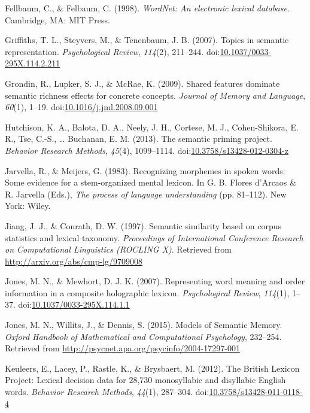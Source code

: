\documentclass[english,,man]{apa6}
\theoremstyle{definition}
\theoremstyle{definition}
\theoremstyle{definition}
\theoremstyle{remark}
\begin{document}
\leavevmode\hypertarget{ref-Felbaum1998}{}%
Fellbaum, C., \& Felbaum, C. (1998). \emph{WordNet: An electronic
lexical database}. Cambridge, MA: MIT Press.

\leavevmode\hypertarget{ref-Griffiths2007}{}%
Griffiths, T. L., Steyvers, M., \& Tenenbaum, J. B. (2007). Topics in
semantic representation. \emph{Psychological Review}, \emph{114}(2),
211--244.
doi:\href{https://doi.org/10.1037/0033-295X.114.2.211}{10.1037/0033-295X.114.2.211}

\leavevmode\hypertarget{ref-Grondin2009}{}%
Grondin, R., Lupker, S. J., \& McRae, K. (2009). Shared features
dominate semantic richness effects for concrete concepts. \emph{Journal
of Memory and Language}, \emph{60}(1), 1--19.
doi:\href{https://doi.org/10.1016/j.jml.2008.09.001}{10.1016/j.jml.2008.09.001}

\leavevmode\hypertarget{ref-Hutchison2013}{}%
Hutchison, K. A., Balota, D. A., Neely, J. H., Cortese, M. J.,
Cohen-Shikora, E. R., Tse, C.-S., \ldots{} Buchanan, E. M. (2013). The
semantic priming project. \emph{Behavior Research Methods},
\emph{45}(4), 1099--1114.
doi:\href{https://doi.org/10.3758/s13428-012-0304-z}{10.3758/s13428-012-0304-z}

\leavevmode\hypertarget{ref-Jarvella1983}{}%
Jarvella, R., \& Meijers, G. (1983). Recognizing morphemes in spoken
words: Some evidence for a stem-organized mental lexicon. In G. B.
Flores d'Arcaos \& R. Jarvella (Eds.), \emph{The process of language
understanding} (pp. 81--112). New York: Wiley.

\leavevmode\hypertarget{ref-Jiang1997}{}%
Jiang, J. J., \& Conrath, D. W. (1997). Semantic similarity based on
corpus statistics and lexical taxonomy. \emph{Proceedings of
International Conference Research on Computational Linguistics (ROCLING
X)}. Retrieved from \url{http://arxiv.org/abs/cmp-lg/9709008}

\leavevmode\hypertarget{ref-Jones2007}{}%
Jones, M. N., \& Mewhort, D. J. K. (2007). Representing word meaning and
order information in a composite holographic lexicon.
\emph{Psychological Review}, \emph{114}(1), 1--37.
doi:\href{https://doi.org/10.1037/0033-295X.114.1.1}{10.1037/0033-295X.114.1.1}

\leavevmode\hypertarget{ref-Jones2015a}{}%
Jones, M. N., Willits, J., \& Dennis, S. (2015). Models of Semantic
Memory. \emph{Oxford Handbook of Mathematical and Computational
Psychology}, 232--254. Retrieved from
\url{http://psycnet.apa.org/psycinfo/2004-17297-001}

\leavevmode\hypertarget{ref-Keuleers2012}{}%
Keuleers, E., Lacey, P., Rastle, K., \& Brysbaert, M. (2012). The
British Lexicon Project: Lexical decision data for 28,730 monosyllabic
and disyllabic English words. \emph{Behavior Research Methods},
\emph{44}(1), 287--304.
doi:\href{https://doi.org/10.3758/s13428-011-0118-4}{10.3758/s13428-011-0118-4}
\end{document}
